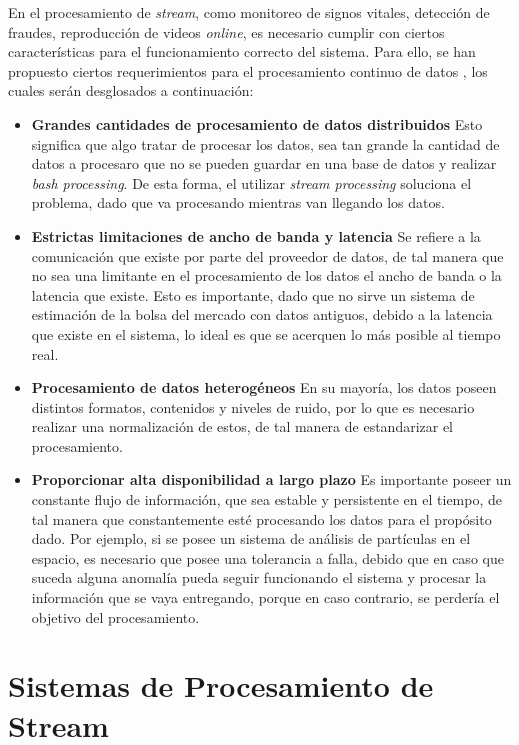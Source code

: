En el procesamiento de \textit{stream}, como monitoreo de signos vitales, detección de fraudes, reproducción de videos \textit{online}, es necesario cumplir con ciertos características para el funcionamiento correcto del sistema. Para ello, se han propuesto ciertos requerimientos para el procesamiento continuo de datos \citep{andrade2014fundamentals}, los cuales serán desglosados a continuación:

\begin{itemize}
	\item \textbf{Grandes cantidades de procesamiento de datos distribuidos} Esto significa que algo tratar de procesar los datos, sea tan grande la cantidad de datos a procesaro que no se pueden guardar en una base de datos y realizar \textit{bash processing}. De esta forma, el utilizar \textit{stream processing} soluciona el problema, dado que va procesando mientras van llegando los datos.
	\item \textbf{Estrictas limitaciones de ancho de banda y latencia} Se refiere a la comunicación que existe por parte del proveedor de datos, de tal manera que no sea una limitante en el procesamiento de los datos el ancho de banda o la latencia que existe. Esto es importante, dado que no sirve un sistema de estimación de la bolsa del mercado con datos antiguos, debido a la latencia que existe en el sistema, lo ideal es que se acerquen lo más posible al tiempo real.
	\item \textbf{Procesamiento de datos heterogéneos} En su mayoría, los datos poseen distintos formatos, contenidos y niveles de ruido, por lo que es necesario realizar una normalización de estos, de tal manera de estandarizar el procesamiento.
	\item \textbf{Proporcionar alta disponibilidad a largo plazo} Es importante poseer un constante flujo de información, que sea estable y persistente en el tiempo, de tal manera que constantemente esté procesando los datos para el propósito dado. Por ejemplo, si se posee un sistema de análisis de partículas en el espacio, es necesario que posee una tolerancia a falla, debido que en caso que suceda alguna anomalía pueda seguir funcionando el sistema y procesar la información que se vaya entregando, porque en caso contrario, se perdería el objetivo del procesamiento.
\end{itemize}

\section{Sistemas de Procesamiento de Stream}

